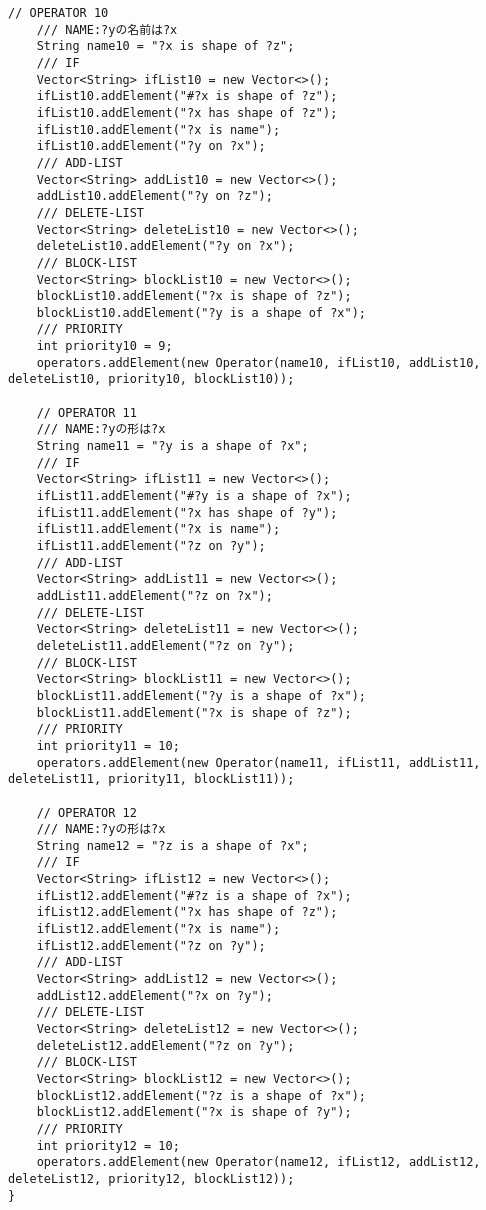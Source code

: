 \documentclass{jarticle}
\begin{document}
\begin{lstlisting}[caption=色や形を扱うオペレータ,label=src:operator]
    // OPERATOR 10
    /// NAME:?yの名前は?x
    String name10 = "?x is shape of ?z";
    /// IF
    Vector<String> ifList10 = new Vector<>();
    ifList10.addElement("#?x is shape of ?z");
    ifList10.addElement("?x has shape of ?z");
    ifList10.addElement("?x is name");
    ifList10.addElement("?y on ?x");
    /// ADD-LIST
    Vector<String> addList10 = new Vector<>();
    addList10.addElement("?y on ?z");
    /// DELETE-LIST
    Vector<String> deleteList10 = new Vector<>();
    deleteList10.addElement("?y on ?x");
    /// BLOCK-LIST
    Vector<String> blockList10 = new Vector<>();
    blockList10.addElement("?x is shape of ?z");
    blockList10.addElement("?y is a shape of ?x");
    /// PRIORITY
    int priority10 = 9;
    operators.addElement(new Operator(name10, ifList10, addList10, deleteList10, priority10, blockList10));
    
    // OPERATOR 11
    /// NAME:?yの形は?x
    String name11 = "?y is a shape of ?x";
    /// IF
    Vector<String> ifList11 = new Vector<>();
    ifList11.addElement("#?y is a shape of ?x");
    ifList11.addElement("?x has shape of ?y");
    ifList11.addElement("?x is name");
    ifList11.addElement("?z on ?y");
    /// ADD-LIST
    Vector<String> addList11 = new Vector<>();
    addList11.addElement("?z on ?x");
    /// DELETE-LIST
    Vector<String> deleteList11 = new Vector<>();
    deleteList11.addElement("?z on ?y");
    /// BLOCK-LIST
    Vector<String> blockList11 = new Vector<>();
    blockList11.addElement("?y is a shape of ?x");
    blockList11.addElement("?x is shape of ?z");
    /// PRIORITY
    int priority11 = 10;
    operators.addElement(new Operator(name11, ifList11, addList11, deleteList11, priority11, blockList11));
    
    // OPERATOR 12
    /// NAME:?yの形は?x
    String name12 = "?z is a shape of ?x";
    /// IF
    Vector<String> ifList12 = new Vector<>();
    ifList12.addElement("#?z is a shape of ?x");
    ifList12.addElement("?x has shape of ?z");
    ifList12.addElement("?x is name");
    ifList12.addElement("?z on ?y");
    /// ADD-LIST
    Vector<String> addList12 = new Vector<>();
    addList12.addElement("?x on ?y");
    /// DELETE-LIST
    Vector<String> deleteList12 = new Vector<>();
    deleteList12.addElement("?z on ?y");
    /// BLOCK-LIST
    Vector<String> blockList12 = new Vector<>();
    blockList12.addElement("?z is a shape of ?x");
    blockList12.addElement("?x is shape of ?y");
    /// PRIORITY
    int priority12 = 10;
    operators.addElement(new Operator(name12, ifList12, addList12, deleteList12, priority12, blockList12));
}
\end{lstlisting}
\end{document}
